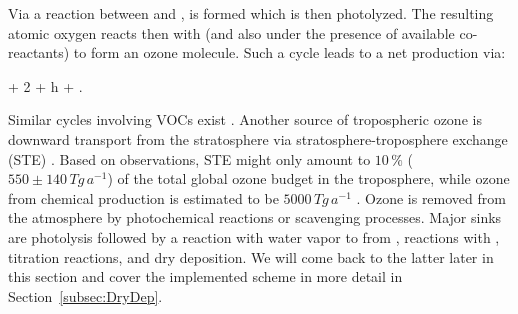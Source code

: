 \documentclass[gmd, manuscript]{copernicus}
\begin{document}
Via a reaction between  and ,  is formed which is then photolyzed. The resulting atomic oxygen reacts then with  (and also under the presence of available co-reactants) to form an ozone molecule.
Such a cycle leads to a net production via:
\begin{reaction}
   + 2 + h\nu \rightarrow {} + .
\end{reaction}
Similar cycles involving VOCs exist \citep{ACP:Monks2015}. Another source of tropospheric ozone is downward transport from the stratosphere via stratosphere-troposphere exchange (STE) \citep{WMO2014}. Based on observations, STE might only amount to $10\,\unit{\%}$ ($550 \pm 140\,\unit{Tg\,a^{-1}}$) of the total global ozone budget in the troposphere, while ozone from chemical production is estimated to be $5000\,\unit{Tg\,a^{-1}}$ \citep{ACP:Monks2015}. Ozone is removed from the atmosphere by photochemical reactions or scavenging processes. Major sinks are photolysis followed by a reaction with water vapor to from ,
reactions with , titration reactions, and dry deposition. We will come back to the latter later in this section and cover the implemented scheme in more detail in Section~\ref{subsec:DryDep}.
\end{document}
